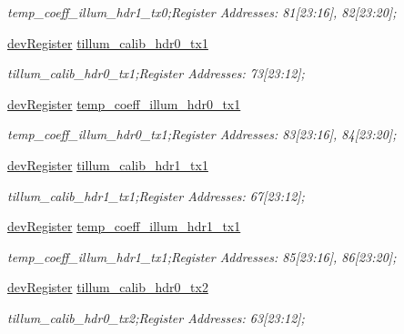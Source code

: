 \begin{DoxyCompactItemize}
\begin{DoxyCompactList}\small\item\em temp\+\_\+coeff\+\_\+illum\+\_\+hdr1\+\_\+tx0;Register Addresses\+: 81\mbox{[}23\+:16\mbox{]}, 82\mbox{[}23\+:20\mbox{]}; \end{DoxyCompactList}\item 
\mbox{\hyperlink{classdev_register}{dev\+Register}} \mbox{\hyperlink{class_o_p_t3101_registers_aacd32d46c41357225b1bbbbd385276dd}{tillum\+\_\+calib\+\_\+hdr0\+\_\+tx1}}
\begin{DoxyCompactList}\small\item\em tillum\+\_\+calib\+\_\+hdr0\+\_\+tx1;Register Addresses\+: 73\mbox{[}23\+:12\mbox{]}; \end{DoxyCompactList}\item 
\mbox{\hyperlink{classdev_register}{dev\+Register}} \mbox{\hyperlink{class_o_p_t3101_registers_ad72cbdc372b0cc91cbd9a68967f58aaa}{temp\+\_\+coeff\+\_\+illum\+\_\+hdr0\+\_\+tx1}}
\begin{DoxyCompactList}\small\item\em temp\+\_\+coeff\+\_\+illum\+\_\+hdr0\+\_\+tx1;Register Addresses\+: 83\mbox{[}23\+:16\mbox{]}, 84\mbox{[}23\+:20\mbox{]}; \end{DoxyCompactList}\item 
\mbox{\hyperlink{classdev_register}{dev\+Register}} \mbox{\hyperlink{class_o_p_t3101_registers_a9aa4c81deafadd6f337ae463292022a7}{tillum\+\_\+calib\+\_\+hdr1\+\_\+tx1}}
\begin{DoxyCompactList}\small\item\em tillum\+\_\+calib\+\_\+hdr1\+\_\+tx1;Register Addresses\+: 67\mbox{[}23\+:12\mbox{]}; \end{DoxyCompactList}\item 
\mbox{\hyperlink{classdev_register}{dev\+Register}} \mbox{\hyperlink{class_o_p_t3101_registers_a73339c9bc37d95767223513628518e2b}{temp\+\_\+coeff\+\_\+illum\+\_\+hdr1\+\_\+tx1}}
\begin{DoxyCompactList}\small\item\em temp\+\_\+coeff\+\_\+illum\+\_\+hdr1\+\_\+tx1;Register Addresses\+: 85\mbox{[}23\+:16\mbox{]}, 86\mbox{[}23\+:20\mbox{]}; \end{DoxyCompactList}\item 
\mbox{\hyperlink{classdev_register}{dev\+Register}} \mbox{\hyperlink{class_o_p_t3101_registers_a2d831cb151e305adbea12b0e4008b88d}{tillum\+\_\+calib\+\_\+hdr0\+\_\+tx2}}
\begin{DoxyCompactList}\small\item\em tillum\+\_\+calib\+\_\+hdr0\+\_\+tx2;Register Addresses\+: 63\mbox{[}23\+:12\mbox{]}; \end{DoxyCompactList}\item 

\end{DoxyCompactItemize}
